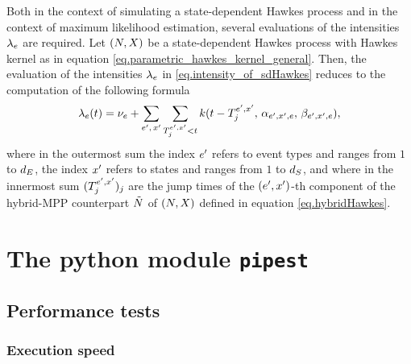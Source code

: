 \documentclass[10pt]{article}
\begin{document}
Both in the context of simulating a state-dependent Hawkes process and in the context of maximum likelihood estimation, several evaluations of the intensities $\intensity$ are required. Let $(\multiCountingProc,\stateVariable)$ be a state-dependent Hawkes process with Hawkes kernel as in equation \eqref{eq.parametric_hawkes_kernel_general}. Then, the evaluation of the intensities $\intensity$ in \eqref{eq.intensity_of_sdHawkes} reduces to the computation of the following formula
\begin{equation*}
 \intensity(t) = \baseRate_e 
 +\sum_{\eone, \, \xone} \sum_{\arrivalTimes[\eone, \xone]_{j} < t} 
 \parametricHawkesKernel(t-\arrivalTimes[\eone, \xone]_{j}, \, \impCoef_{\eone,\xone, e}, \,  \decCoef_{\eone,\xone, e}),
\end{equation*}
where in the outermost sum the index $\eone$ refers to event types and ranges from $1$ to $\numEventTypes$, the index $\xone$ refers to states and ranges from $1$ to $\numStates$, and where in the innermost sum $(\arrivalTimes[\eone, \xone]_{j})_j$ are the jump times of the $(\eone, \xone)$-th component of the hybrid-MPP counterpart $\hybridHawkes$ of $(\multiCountingProc,\stateVariable)$ defined in equation \eqref{eq.hybridHawkes}.





\section{The python module \texttt{pipest}}
\subsection{Performance tests}
\subsubsection{Execution speed}
\end{document}
